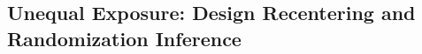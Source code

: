 \documentclass[11pt,a4paper]{article}
\theoremstyle{plain}
\theoremstyle{definition}
\begin{document}
\subsection{Unequal Exposure: Design Recentering and Randomization Inference}
\label{sec:recentered}

\end{document}
